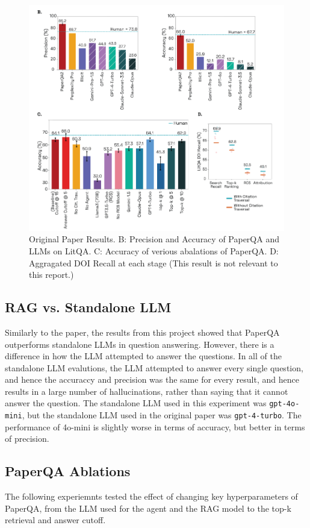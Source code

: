 \begin{figure}[H]
    \centering
    \includegraphics[width=\textwidth]{figures/original_result.png}
    \caption{Original Paper Results. B: Precision and Accuracy of PaperQA and LLMs on LitQA. C: Accuracy of verious abalations of PaperQA. D: Aggragated DOI Recall at each stage (This result is not relevant to this report.)}
    \label{fig:original_result}
\end{figure}

\subsection{RAG vs. Standalone LLM}

Similarly to the paper, the results from this project showed that PaperQA outperforms standalone LLMs in question answering. However, there is a difference in how the LLM attempted to answer the questions. In all of the standalone LLM evalutions, the LLM attempted to answer every single question, and hence the accuraccy and precision was the same for every result, and hence results in a large number of hallucinations, rather than saying that it cannot answer the question. The standalone LLM used in this experiment was \texttt{gpt-4o-mini}, but the standalone LLM used in the original paper was \texttt{gpt-4-turbo}. The performance of 4o-mini is slightly worse in terms of accuracy, but better in terms of precision. 

\subsection{PaperQA Ablations}
The following experiemnts tested the effect of changing key hyperparameters of PaperQA, from the LLM used for the agent and the RAG model to the top-k retrieval and answer cutoff. 

